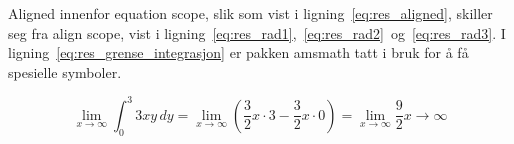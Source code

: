 Aligned innenfor equation scope, slik som vist i ligning~\eqref{eq:res_aligned}, skiller seg fra align scope, vist i ligning~\eqref{eq:res_rad1},~\eqref{eq:res_rad2}~og~\eqref{eq:res_rad3}. 
I ligning~\eqref{eq:res_grense_integrasjon} er pakken amsmath tatt i bruk for å få spesielle symboler.

\begin{equation}
    \lim_{x \to \infty} \int_{0}^{3} 3xy \,dy 
    = \lim_{x \to \infty} \left( \frac{3}{2}x \cdot 3 - \frac{3}{2}x \cdot 0 \right)
    = \lim_{x \to \infty} \frac{9}{2}x \rightarrow \infty
    \label{eq:res_grense_integrasjon}
\end{equation}